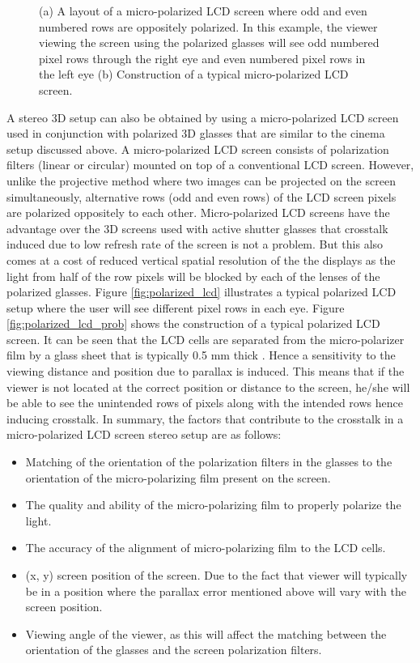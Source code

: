 \begin{figure}[htbp]
    \caption{(a) A layout of a micro-polarized LCD screen where odd and even numbered rows are oppositely polarized. In this example, the viewer viewing the screen using the polarized glasses will see odd numbered pixel rows through the right eye and even numbered pixel rows in the left eye \cite{woods2012crosstalk} (b) {Construction of a typical micro-polarized LCD screen}.\label{fig:LCD_polarized}}
\end{figure}
A stereo 3D setup can also be obtained by using a micro-polarized LCD screen used in conjunction with polarized 3D glasses that are similar to the cinema setup discussed above. A micro-polarized LCD screen consists of polarization filters (linear or circular) mounted on top of a conventional LCD screen. However, unlike the projective method where two images can be projected on the screen simultaneously, alternative rows (odd and even rows) of the LCD screen pixels are polarized oppositely to each other. Micro-polarized LCD screens have the advantage over the 3D screens used with active shutter glasses that crosstalk induced due to low refresh rate of the screen is not a problem. But this also comes at a cost of reduced vertical spatial resolution of the the displays as the light from half of the row pixels will be blocked by each of the lenses of the polarized glasses. Figure \ref{fig:polarized_lcd} illustrates a typical polarized LCD setup where the user will see different pixel rows in each eye. Figure \ref{fig:polarized_lcd_prob} shows the construction of a typical polarized LCD screen. It can be seen that the LCD cells are separated from the micro-polarizer film by a glass sheet that is typically 0.5 mm thick \cite{woods2012crosstalk}. Hence a sensitivity to the viewing distance and position due to parallax is induced. This means that if the viewer is not located at the correct position or distance to the screen, he/she will be able to see the unintended rows of pixels along with the intended rows hence inducing crosstalk. In summary, the factors that contribute to the crosstalk in a micro-polarized LCD screen stereo setup are as follows:
\begin{itemize}
\item{Matching of the orientation of the polarization filters in the glasses to the orientation of the micro-polarizing film present on the screen.}
\item{The quality and ability of the micro-polarizing film to properly polarize the light.}
\item{The accuracy of the alignment of micro-polarizing film to the LCD cells.}
\item{(x, y) screen position of the screen. Due to the fact that viewer will typically be in a position where the parallax error mentioned above will vary with the screen position.}
\item{Viewing angle of the viewer, as this will affect the matching between the orientation of the glasses and the screen polarization filters.}
\end{itemize}

